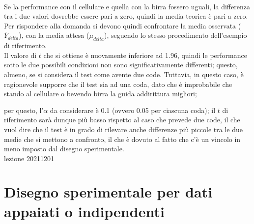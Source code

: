 \documentclass[10pt, draft]{book}
\begin{document}
\\
Se la performance con il cellulare e quella con la birra fossero uguali, la differenza tra i due valori dovrebbe essere pari a zero, quindi la media teorica è pari a zero.
\\
Per rispondere alla domanda si devono quindi confrontare la media osservata ($\overline{Y}_{delta}$), con la media attesa ($\mu_{delta}$), seguendo lo stesso procedimento dell'esempio di riferimento.
\\
Il valore di $t$ che si ottiene è nuovamente inferiore ad 1.96, quindi le performance sotto le due possibili condizioni non sono significativamente differenti; questo, almeno, se si considera il test come avente due code. Tuttavia, in questo caso, è ragionevole supporre che il test sia ad una coda, dato che è improbabile che stando al cellulare o bevendo birra la guida addirittura migliori; \colorbox{lyellow}{\parbox{0.98\textwidth}{per questo, l'$\alpha$ da considerare è 0.1 (ovvero 0.05 per ciascuna coda); il $t$ di riferimento sarà dunque più basso rispetto al caso che prevede due code, il che vuol dire che il test è in grado di rilevare anche differenze più piccole tra le due medie che si mettono a confronto, il che è dovuto al fatto che c'è un vincolo in meno imposto dal disegno sperimentale.
\\
lezione 20211201}}

\section{Disegno sperimentale per dati appaiati o indipendenti}
\end{document}
